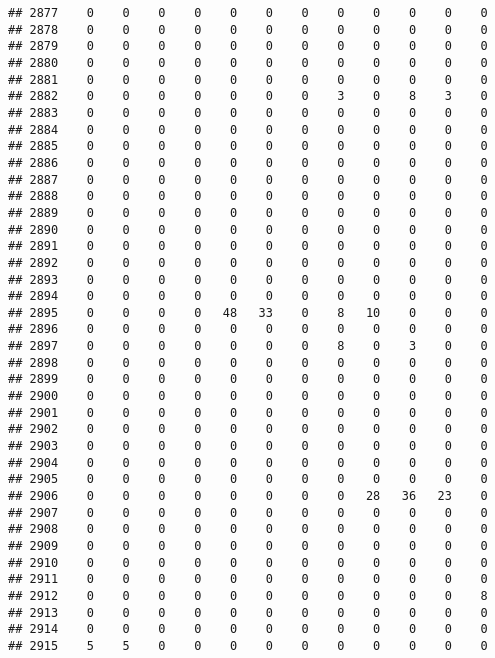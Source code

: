 \documentclass[]{article}
\begin{document}
\begin{verbatim}
## 2877    0    0    0    0    0    0    0    0    0    0    0    0
## 2878    0    0    0    0    0    0    0    0    0    0    0    0
## 2879    0    0    0    0    0    0    0    0    0    0    0    0
## 2880    0    0    0    0    0    0    0    0    0    0    0    0
## 2881    0    0    0    0    0    0    0    0    0    0    0    0
## 2882    0    0    0    0    0    0    0    3    0    8    3    0
## 2883    0    0    0    0    0    0    0    0    0    0    0    0
## 2884    0    0    0    0    0    0    0    0    0    0    0    0
## 2885    0    0    0    0    0    0    0    0    0    0    0    0
## 2886    0    0    0    0    0    0    0    0    0    0    0    0
## 2887    0    0    0    0    0    0    0    0    0    0    0    0
## 2888    0    0    0    0    0    0    0    0    0    0    0    0
## 2889    0    0    0    0    0    0    0    0    0    0    0    0
## 2890    0    0    0    0    0    0    0    0    0    0    0    0
## 2891    0    0    0    0    0    0    0    0    0    0    0    0
## 2892    0    0    0    0    0    0    0    0    0    0    0    0
## 2893    0    0    0    0    0    0    0    0    0    0    0    0
## 2894    0    0    0    0    0    0    0    0    0    0    0    0
## 2895    0    0    0    0   48   33    0    8   10    0    0    0
## 2896    0    0    0    0    0    0    0    0    0    0    0    0
## 2897    0    0    0    0    0    0    0    8    0    3    0    0
## 2898    0    0    0    0    0    0    0    0    0    0    0    0
## 2899    0    0    0    0    0    0    0    0    0    0    0    0
## 2900    0    0    0    0    0    0    0    0    0    0    0    0
## 2901    0    0    0    0    0    0    0    0    0    0    0    0
## 2902    0    0    0    0    0    0    0    0    0    0    0    0
## 2903    0    0    0    0    0    0    0    0    0    0    0    0
## 2904    0    0    0    0    0    0    0    0    0    0    0    0
## 2905    0    0    0    0    0    0    0    0    0    0    0    0
## 2906    0    0    0    0    0    0    0    0   28   36   23    0
## 2907    0    0    0    0    0    0    0    0    0    0    0    0
## 2908    0    0    0    0    0    0    0    0    0    0    0    0
## 2909    0    0    0    0    0    0    0    0    0    0    0    0
## 2910    0    0    0    0    0    0    0    0    0    0    0    0
## 2911    0    0    0    0    0    0    0    0    0    0    0    0
## 2912    0    0    0    0    0    0    0    0    0    0    0    8
## 2913    0    0    0    0    0    0    0    0    0    0    0    0
## 2914    0    0    0    0    0    0    0    0    0    0    0    0
## 2915    5    5    0    0    0    0    0    0    0    0    0    0

\end{verbatim}
\end{document}
